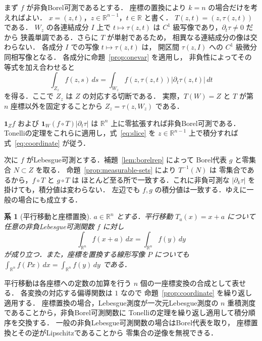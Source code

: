 \documentclass[a5paper,10pt,onecolumn]{jsarticle}
\makeatletter
\theoremstyle{mathnotetheorem}
\newtheorem{corollary}[theorem]{系}
\renewcommand{\proofname}{証明}
\renewenvironment{proof}[1][\proofname]{%
  \par\pushQED{\qed}\normalfont\topsep4\p@\@plus2\p@\relax
  \trivlist\item[\hskip\labelsep\bfseries #1]\ignorespaces
}{\popQED\endtrivlist\@endpefalse}
\newcommand{\R}{\mathbb{R}}
\newcommand{\abs}[1]{\lvert #1\rvert}
\makeatother
\begin{document}
\begin{proof}
まず $f$ が非負Borel可測であるとする．
座標の置換により $k=n$ の場合だけを考えればよい．
$x=(z,t)$，$z\in\R^{n-1}$，$t\in\R$ と書く．
$T(z,t)=(z,\tau(z,t))$ である．
$W_z$ の各連結成分 $I$ 上で $t\mapsto\tau(z,t)$ は
$C^1$ 級写像であり，$\partial_t\tau\ne0$ だから
狭義単調である．さらに $T$ が単射であるため，
相異なる連結成分の像は交わらない．
各成分 $I$ での写像 $t\mapsto\tau(z,t)$ は，
開区間 $\tau(z,I)$ への $C^1$ 級微分同相写像となる．
各成分に命題~\ref{prop:onevar} を適用し，
非負性によってその等式を加え合わせると
\begin{equation}\label{eq:slice}
 \int_{Z_z}f(z,s)\,ds
 =\int_{W_z}f(z,\tau(z,t))
             \abs{\partial_t\tau(z,t)}\,dt
\end{equation}
を得る．ここで $Z_z$ は $Z$ の対応する切断である．
実際，$T(W)=Z$ と $T$ が第 $n$ 座標以外を固定することから
$Z_z=\tau(z,W_z)$ である．

$\mathbf1_Z f$ および
$\mathbf1_W(f\circ T)\abs{\partial_t\tau}$ は
$\R^n$ 上に零拡張すれば非負Borel可測である．
Tonelliの定理をこれらに適用し，式~\eqref{eq:slice} を
$z\in\R^{n-1}$ 上で積分すれば式~\eqref{eq:coordinate} が従う．

次に $f$ がLebesgue可測とする．補題~\ref{lem:borelrep} によって
Borel代表 $g$ と零集合 $N\subset Z$ を取る．
命題~\ref{prop:measurable-sets} により $T^{-1}(N)$ は
零集合であるから，$f\circ T$ と $g\circ T$ は
ほとんど至る所で一致する．これに非負可測な
$\abs{\partial_k\tau}$ を掛けても，積分値は変わらない．
左辺でも $f,g$ の積分値は一致する．ゆえに一般の場合にも成立する．
\end{proof}

\begin{corollary}[平行移動と座標置換]\label{cor:translation}
$a\in\R^n$ とする．平行移動 $T_a(x)=x+a$ について
任意の非負Lebesgue可測関数 $f$ に対し
\[
 \int_{\R^n}f(x+a)\,dx=\int_{\R^n}f(y)\,dy
\]
が成り立つ．また，座標を置換する線形写像 $P$ についても
$\int_{\R^n}f(Px)\,dx=\int_{\R^n}f(y)\,dy$ である．
\end{corollary}

\begin{proof}
平行移動は各座標への定数の加算を行う
$n$ 個の一座標変換の合成として表せる．
各変換の対応する偏導関数は $1$ なので
命題~\ref{prop:coordinate} を繰り返し適用する．
座標置換の場合，Lebesgue測度が一次元Lebesgue測度の
$n$ 重積測度であることから，非負Borel可測関数に
Tonelliの定理を繰り返し適用して積分順序を交換する．
一般の非負Lebesgue可測関数の場合はBorel代表を取り，
座標置換とその逆がLipschitzであることから
零集合の逆像を無視できる．
\end{proof}
\end{document}
